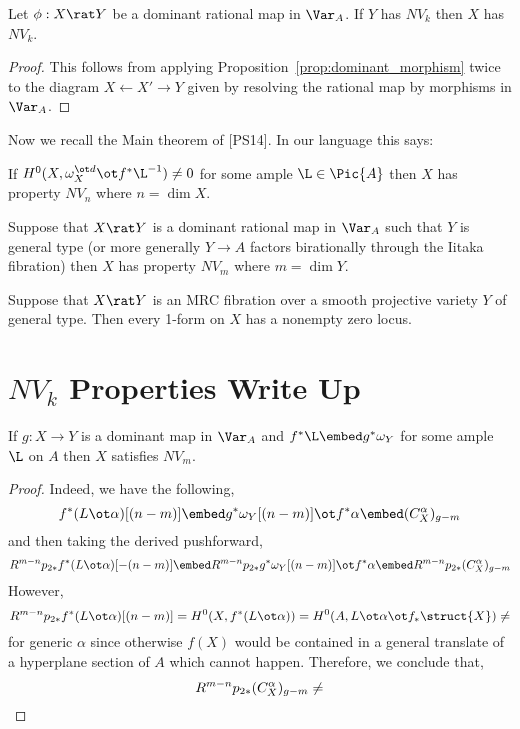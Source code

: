 \documentclass[12pt]{article}
\begin{document}
\begin{prop} \label{prop:rational_map_functoriality}
Let $\phi : X \rat Y$ be a dominant rational map in $\Var_A$. If $Y$ has $NV_k$ then $X$ has $NV_k$. 
\end{prop}

\begin{proof}
This follows from applying Proposition~\ref{prop:dominant_morphism} twice to the diagram $X \leftarrow X' \to Y$ given by resolving the rational map by morphisms in $\Var_A$. 
\end{proof}

Now we recall the Main theorem of [PS14]. In our language this says:

\begin{theorem}[PS14]
If $H^0(X, \omega_X^{\ot d} \ot f^* \L^{-1}) \neq 0$ for some ample $\L \in \Pic{A}$ then $X$ has property $NV_n$ where $n = \dim{X}$. 
\end{theorem}

\begin{cor}
Suppose that $X \rat Y$ is a dominant rational map in $\Var_A$ such that $Y$ is general type (or more generally $Y \to A$ factors birationally through the Iitaka fibration) then $X$ has property $NV_{m}$ where $m = \dim{Y}$. 
\end{cor}

\begin{cor}
Suppose that $X \rat Y$ is an MRC fibration over a smooth projective variety $Y$ of general type. Then every 1-form on $X$ has a nonempty zero locus.
\end{cor}

\newpage

\section{$NV_k$ Properties Write Up}

\begin{prop}
If $g : X \to Y$ is a dominant map in $\Var_A$ and $f^* \L \embed g^* \omega_Y$ for some ample $\L$ on $A$ then $X$ satisfies $NV_m$.
\end{prop}

\begin{proof}
Indeed, we have the following,
\[ f^* (L \ot \alpha)[(n-m)] \embed g^* \omega_Y [(n-m)] \ot f^* \alpha \embed (C_X^\alpha)_{g-m} \]
and then taking the derived pushforward,
\[ R^{m-n} p_{2*} f^* (L \ot \alpha)[-(n-m)] \embed R^{m-n} p_{2*} g^* \omega_Y [(n-m)] \ot f^* \alpha \embed R^{m-n} p_{2*} (C_X^\alpha)_{g-m} \]
However, 
\[  R^{m-n} p_{2*} f^* (L \ot \alpha)[(n-m)] = H^0(X, f^* (L \ot \alpha)) = H^0(A, L \ot \alpha \ot f_* \struct{X}) \neq \empty \]
for generic $\alpha$ since otherwise $f(X)$ would be contained in a general translate of a hyperplane section of $A$ which cannot happen. Therefore, we conclude that,
\[ R^{m-n} p_{2*} (C_X^\alpha)_{g-m} \neq \empty \]
\end{proof}
 
\end{document}
